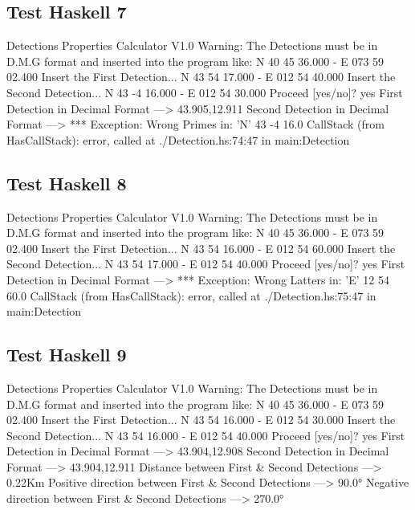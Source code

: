 \documentclass{article}
\begin{document}
\subsection*{Test Haskell 7}
	\begin{spverbatim}
		Detections Properties Calculator V1.0 
		Warning: The Detections must be in D.M.G format and inserted into the program like: N 40 45 36.000 - E 073 59 02.400
		Insert the First Detection...
		N 43 54 17.000 - E 012 54 40.000
		Insert the Second Detection...
		N 43 -4 16.000 - E 012 54 30.000
		Proceed [yes/no]?
		yes
		First Detection in Decimal Format ---> 43.905,12.911
		Second Detection in Decimal Format ---> *** Exception: Wrong Primes in:  'N' 43 -4 16.0
		CallStack (from HasCallStack):
		error, called at ./Detection.hs:74:47 in main:Detection
	\end{spverbatim}

\subsection*{Test Haskell 8}
	\begin{spverbatim}
		Detections Properties Calculator V1.0 
		Warning: The Detections must be in D.M.G format and inserted into the program like: N 40 45 36.000 - E 073 59 02.400
		Insert the First Detection...
		N 43 54 16.000 - E 012 54 60.000
		Insert the Second Detection...
		N 43 54 17.000 - E 012 54 40.000
		Proceed [yes/no]?
		yes
		First Detection in Decimal Format ---> *** Exception: Wrong Latters in:  'E' 12 54 60.0
		CallStack (from HasCallStack):
		error, called at ./Detection.hs:75:47 in main:Detection
	\end{spverbatim}

\subsection*{Test Haskell 9}
	\begin{spverbatim}
		Detections Properties Calculator V1.0 
		Warning: The Detections must be in D.M.G format and inserted into the program like: N 40 45 36.000 - E 073 59 02.400
		Insert the First Detection...
		N 43 54 16.000 - E 012 54 30.000
		Insert the Second Detection...
		N 43 54 16.000 - E 012 54 40.000
		Proceed [yes/no]?
		yes
		First Detection in Decimal Format ---> 43.904,12.908
		Second Detection in Decimal Format ---> 43.904,12.911
		Distance between First & Second Detections ---> 0.22Km
		Positive direction between First & Second Detections ---> 90.0°
		Negative direction between First & Second Detections ---> 270.0°
	\end{spverbatim}
\end{document}
